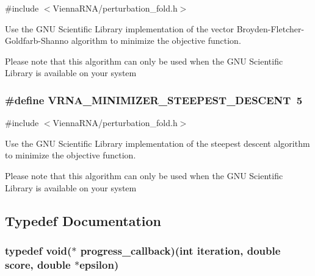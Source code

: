 {\ttfamily \#include $<$Vienna\+R\+N\+A/perturbation\+\_\+fold.\+h$>$}



Use the G\+N\+U Scientific Library implementation of the vector Broyden-\/\+Fletcher-\/\+Goldfarb-\/\+Shanno algorithm to minimize the objective function. 

Please note that this algorithm can only be used when the G\+N\+U Scientific Library is available on your system \hypertarget{group__soft__constraints_ga9ecd2144c2ebed7533233da3986521b0}{
\subsubsection[{V\+R\+N\+A\+\_\+\+M\+I\+N\+I\+M\+I\+Z\+E\+R\+\_\+\+S\+T\+E\+E\+P\+E\+S\+T\+\_\+\+D\+E\+S\+C\+E\+N\+T}]{\setlength{\rightskip}{0pt plus 5cm}\#define V\+R\+N\+A\+\_\+\+M\+I\+N\+I\+M\+I\+Z\+E\+R\+\_\+\+S\+T\+E\+E\+P\+E\+S\+T\+\_\+\+D\+E\+S\+C\+E\+N\+T~5}}\label{group__soft__constraints_ga9ecd2144c2ebed7533233da3986521b0}


{\ttfamily \#include $<$Vienna\+R\+N\+A/perturbation\+\_\+fold.\+h$>$}



Use the G\+N\+U Scientific Library implementation of the steepest descent algorithm to minimize the objective function. 

Please note that this algorithm can only be used when the G\+N\+U Scientific Library is available on your system 

\subsection{Typedef Documentation}
\hypertarget{group__soft__constraints_gafd57325a0fa4307cd72f933107f9d493}{
\subsubsection[{progress\+\_\+callback}]{\setlength{\rightskip}{0pt plus 5cm}typedef void($\ast$ progress\+\_\+callback)(int iteration, double score, double $\ast$epsilon)}}\label{group__soft__constraints_gafd57325a0fa4307cd72f933107f9d493}


